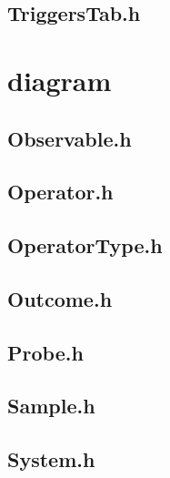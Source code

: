 \subsection{TriggersTab.h}


\section{diagram}

\subsection{Observable.h}


\subsection{Operator.h}


\subsection{OperatorType.h}


\subsection{Outcome.h}


\subsection{Probe.h}


\subsection{Sample.h}


\subsection{System.h}


